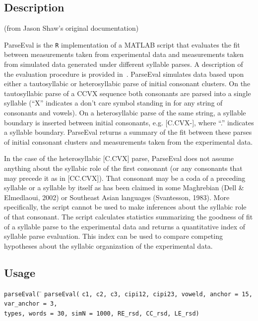 \documentclass[
draft=false,
toc=graduated,
listof=totoc,
headsepline=true,
]%
{scrartcl}
\begin{document}
\subsection{Description}
\begin{flushleft}
\begin{scriptsize}
(from Jason Shaw's original documentation)
\end{scriptsize}
\end{flushleft}
ParseEval is the \texttt{R} implementation of a MATLAB script that evaluates the fit between measurements taken from experimental data and measurements taken from simulated data generated under different syllable parses. A description of the evaluation procedure is provided in~\textcite{Shaw2010}. ParseEval simulates data based upon either a tautosyllabic or heterosyllabic parse of initial consonant clusters. On the tautosyllabic parse of a CCVX sequence both consonants are parsed into a single syllable (\enquote{X} indicates a don't care symbol standing in for any string of consonants and vowels). On a heterosyllabic parse of the same string, a syllable boundary is inserted between initial consonants, e.g. [C.CVX-], where \enquote{.} indicates a syllable boundary. ParseEval returns a summary of the fit between these parses of initial consonant clusters and measurements taken from the experimental data.\par
In the case of the heterosyllabic [C.CVX] parse, ParseEval does not assume anything about the syllabic role of the first consonant (or any consonants that may precede it as in [CC.CVX]). That consonant may be a coda of a preceding syllable or a syllable by itself as has been claimed in some Maghrebian (Dell \& Elmedlaoui, 2002) or Southeast Asian languages (Svantesson, 1983). More specifically, the script cannot be used to make inferences about the syllabic role of that consonant. The script calculates statistics summarizing the goodness of fit of a syllable parse to the experimental data and returns a quantitative index of syllable parse evaluation. This index can be used to compare competing hypotheses about the syllabic organization of the experimental data.
\subsection{Usage}
\begin{tabbing}
\texttt{parseEval(} \= \kill
\texttt{parseEval(} \> \texttt{c1, c2, c3, cipi12, cipi23, voweld, anchor = 15, var\_anchor = 3,}\\%
 \>\texttt{types, words = 30, simN = 1000, RE\_rsd, CC\_rsd, LE\_rsd)}
\end{tabbing}
\pagebreak
\end{document}
